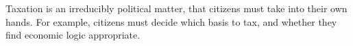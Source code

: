 Taxation is an irreducibly political matter, that citizens must take into their own hands.
For example, citizens must decide which basis to tax, and whether they find economic logic appropriate.
